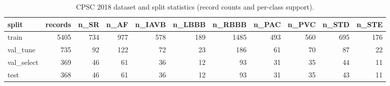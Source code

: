 \begin{table}[htbp]\centering\caption{CPSC 2018 dataset and split statistics (record counts and per-class support).}\label{tab:dataset}
\begin{tabular}{lrrrrrrrrrr}
\toprule
split & records & n_SR & n_AF & n_IAVB & n_LBBB & n_RBBB & n_PAC & n_PVC & n_STD & n_STE \\
\midrule
train & 5405 & 734 & 977 & 578 & 189 & 1485 & 493 & 560 & 695 & 176 \\
val_tune & 735 & 92 & 122 & 72 & 23 & 186 & 61 & 70 & 87 & 22 \\
val_select & 369 & 46 & 61 & 36 & 12 & 93 & 31 & 35 & 44 & 11 \\
test & 368 & 46 & 61 & 36 & 12 & 93 & 31 & 35 & 43 & 11 \\
\bottomrule
\end{tabular}
\end{table}
